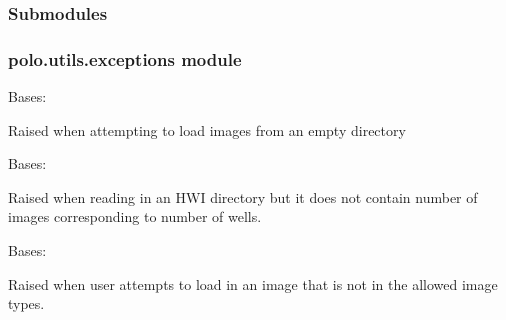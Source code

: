 \documentclass[letterpaper,10pt,english]{sphinxmanual}
\begin{document}
\subsubsection{Submodules}
\label{\detokenize{polo.utils:submodules}}

\subsubsection{polo.utils.exceptions module}
\label{\detokenize{polo.utils:module-polo.utils.exceptions}}\label{\detokenize{polo.utils:polo-utils-exceptions-module}}

\begin{fulllineitems}
\label{\detokenize{polo.utils:polo.utils.exceptions.EmptyDirectoryError}}
Bases: 

Raised when attempting to load images from an empty directory

\end{fulllineitems}


\begin{fulllineitems}
\label{\detokenize{polo.utils:polo.utils.exceptions.EmptyRunNameError}}
Bases: 

Raised when reading in an HWI directory but it does not contain number
of images corresponding to number of wells.

\end{fulllineitems}


\begin{fulllineitems}
\label{\detokenize{polo.utils:polo.utils.exceptions.ForbiddenImageTypeError}}
Bases: 

Raised when user attempts to load in an image that is not in the allowed
image types.

\end{fulllineitems}
\end{document}
